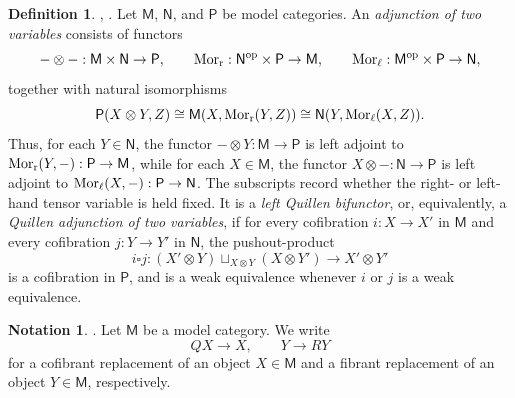 \documentclass{amsart}
\newcommand{\cat}[1]{\mathsf{#1}}
\newcommand{\Mor}{\textnormal{Mor}}
\renewcommand{\op}{\mathrm{op}}
\theoremstyle{definition}
\newtheorem{definition}[equation]{Definition}
\newtheorem{notation}[equation]{Notation}
\numberwithin{equation}{subsection}
\numberwithin{subsubsection}{subsection}
\begin{document}
\begin{definition}\label{def:left.quillen.bifunctor}
  \textnormal{\cite[Definition~4.2.1]{Hov99}},
  \textnormal{\cite[Definition~1.27.1]{Bar10}}.
  Let \(\cat{M}\), \(\cat{N}\), and \(\cat{P}\) be model categories. An
  \emph{adjunction of two variables} consists of functors
  \[
    -\otimes-:\cat{M}\times\cat{N}\to\cat{P},
    \qquad
    \Mor_{\mathrm{r}}:\cat{N}^{\op}\times\cat{P}\to\cat{M},
    \qquad
    \Mor_{\mathrm{\ell}}:\cat{M}^{\op}\times\cat{P}\to\cat{N},
  \]
  together with natural isomorphisms
  \[
    \cat{P}(X\otimes Y,Z)
    \cong
    \cat{M}(X,\Mor_{\mathrm{r}}(Y,Z))
    \cong
    \cat{N}(Y,\Mor_{\mathrm{\ell}}(X,Z)).
  \]
  Thus, for each \(Y\in\cat{N}\), the functor
  \(-\otimes Y:\cat{M}\to\cat{P}\) is left adjoint to
  \(\Mor_{\mathrm{r}}(Y,-):\cat{P}\to\cat{M}\), while for each
  \(X\in\cat{M}\), the functor \(X\otimes-:\cat{N}\to\cat{P}\) is left
  adjoint to \(\Mor_{\mathrm{\ell}}(X,-):\cat{P}\to\cat{N}\). The
  subscripts record whether the right- or left-hand tensor variable is held
  fixed.
  It is a \emph{left Quillen bifunctor}, or, equivalently, a \emph{Quillen
    adjunction
  of two variables}, if for every cofibration \(i:X\to X'\) in \(\cat{M}\)
  and every cofibration \(j:Y\to Y'\) in \(\cat{N}\), the pushout-product
  \[
    i\square j:
    (X'\otimes Y)\sqcup_{X\otimes Y}(X\otimes Y')
    \longrightarrow
    X'\otimes Y'
  \]
  is a cofibration in \(\cat{P}\), and is a weak equivalence whenever
  \(i\) or \(j\) is a weak equivalence.
\end{definition}

\begin{notation}\label{def:cofibrant.fibrant.replacement}
  \textnormal{\cite[Paragraph before Lemma 1.1.9]{Hov99}}.
  Let \(\cat{M}\) be a model category. We write
  \[
    QX \to X,
    \qquad
    Y \to RY
  \]
  for a cofibrant replacement of an object \(X\in \cat{M}\) and a
  fibrant replacement of an object \(Y\in \cat{M}\), respectively.
\end{notation}
\end{document}

